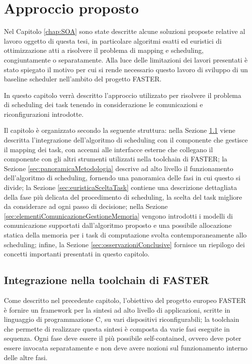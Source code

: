 \chapter{Approccio proposto}
\label{chap:approccio}
\vspace{1cm}
Nel Capitolo \ref{chap:SOA} sono state descritte alcune soluzioni proposte 
relative al lavoro oggetto di questa tesi, in particolare algoritmi esatti ed
euristici di ottimizzazione atti a risolvere il problema di mapping e 
scheduling, congiuntamente o separatamente. Alla luce delle limitazioni dei 
lavori presentati è stato spiegato il motivo per cui si rende necessario questo 
lavoro di sviluppo di un baseline scheduler nell'ambito del progetto 
\ac{FASTER}.

In questo capitolo verrà descritto l'approccio utilizzato per risolvere il 
problema di scheduling dei task tenendo in considerazione le comunicazioni e 
riconfigurazioni introdotte.

Il capitolo è organizzato secondo la seguente struttura: nella Sezione 
\ref{sec:integrazioneToolchainFASTER} viene descritta l'integrazione 
dell'algoritmo di scheduling con il componente che gestisce il mapping dei task, 
con accenni alle interfacce esterne che collegano il componente 
con gli altri strumenti utilizzati nella toolchain di \acs{FASTER}; la Sezione 
\ref{sec:panoramicaMetodologia} descrive ad alto livello il funzionamento 
dell'algoritmo di scheduling, fornendo una panoramica delle fasi in cui questo 
si divide; la Sezione \ref{sec:euristicaSceltaTask} contiene una descrizione 
dettagliata della fase più delicata del procedimento di scheduling, la scelta 
del task migliore da considerare ad ogni passo di decisione; nella Sezione 
\ref{sec:elementiComunicazioneGestioneMemoria} vengono introdotti i modelli di 
comunicazione supportati dall'algoritmo proposto e una possibile allocazione 
statica della memoria per i task di computazione svolta contemporaneamente allo 
scheduling; infine, la Sezione \ref{sec:osservazioniConclusive} fornisce un 
riepilogo dei concetti importanti presentati in questo capitolo.


\section{Integrazione nella toolchain di \acs{FASTER}}
\label{sec:integrazioneToolchainFASTER}

Come descritto nel precedente capitolo, l'obiettivo del progetto europeo 
\ac{FASTER} è fornire un framework per la sintesi ad alto livello di 
applicazioni, scritte in linguaggio di programmazione C, su vari dispositivi 
riconfigurabili; la toolchain che permette di realizzare questa sintesi è 
composta da varie fasi eseguite in sequenza. Ogni fase deve essere il più 
possibile self-contained, ovvero deve poter essere invocata separatamente e non 
deve avere nozioni sul funzionamento interno delle altre fasi.

